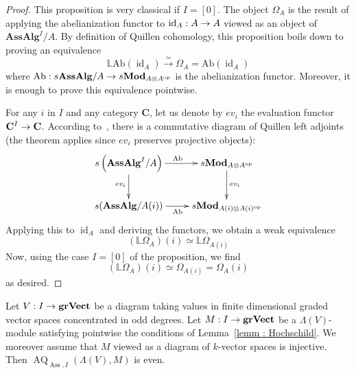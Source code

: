 \documentclass[10pt]{amsart}
\theoremstyle{definition}\newtheorem{defi}[theo]{Definition}\newtheorem{rema}[theo]{Remark}\newtheorem{exam}[theo]{Example}\newtheorem{exem}[theo]{Example}\newtheorem{nota}[theo]{Notation}
\DeclareMathOperator{\opp}{op}
\DeclareMathOperator{\Ass}{Ass}
\DeclareMathOperator{\id}{id}
\DeclareMathOperator{\AQ}{AQ}
\newcommand{\AssAlg}{\mathbf{AssAlg}}
\newcommand{\grVect}{\mathbf{grVect}}
\newcommand{\bMod}{\mathbf{Mod}}
\newcommand{\rAb}{\mathrm{Ab}}
\newcommand{\bfC}{\mathbf{C}}
\newcommand{\bbL}{\mathbb{L}}
\renewcommand*{\to}{\mathchoice{\longrightarrow}{\rightarrow}{\rightarrow}{\rightarrow}}
\begin{document}
\begin{proof}
This proposition is very classical if $I=[0]$. The object $\Omega_A$ is the result of applying the abelianization functor to $\id_A: A\to A$ viewed as an object of $\AssAlg^I/A$. By definition of Quillen cohomology, this proposition boils down to proving an equivalence
\[
\bbL\rAb(\id_A)\xrightarrow{\simeq} \Omega_A=\rAb(\id_A)
\]
where $\rAb: s\AssAlg/A\to s\bMod_{A\otimes A^{\opp}}$ is the abelianization functor. Moreover, it is enough to prove this equivalence pointwise.

For any $i$ in $I$ and any category $\bfC$, let us denote by $ev_i$ the evaluation functor $\bfC^I\to \bfC$. According to~\cite[Theorem~4.7]{franklandbehavior}, there is a commutative diagram of Quillen left adjoints (the theorem applies since $ev_i$ preserves projective objects):
\[
\xymatrix{ s\left(\AssAlg^I/A\right)\ar[d]_{ev_i}\ar[r]^{\rAb}&s\bMod_{A\otimes A^{\opp}}\ar[d]^{ev_i}\\
s(\AssAlg/A(i))\ar[r]_{\rAb}&s\bMod_{A(i)\otimes A(i)^{\opp}} }
\]
Applying this to $\id_A$ and deriving the functors, we obtain a weak equivalence
\[
(\bbL\Omega_A)(i)\simeq \bbL\Omega_{A(i)}
\]
Now, using the case $I=[0]$ of the proposition, we find
\[
(\bbL\Omega_A)(i)\simeq \Omega_{A(i)}=\Omega_A(i)
\]
as desired.
\end{proof}
\begin{prop}
Let $V: I\to\grVect$ be a diagram taking values in finite dimensional graded vector spaces concentrated in odd degrees. Let $M: I\to \grVect$ be a $\Lambda(V)$-module satisfying pointwise the conditions of Lemma~\ref{lemm : Hochschild}. We moreover assume that $M$ viewed as a diagram of $k$-vector spaces is injective. Then $\AQ_{\Ass,I}(\Lambda(V),M)$ is even.
\end{prop}
\end{document}
